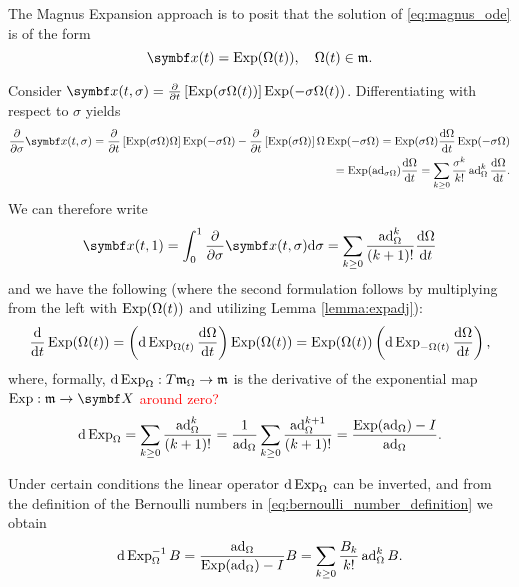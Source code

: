 The Magnus Expansion approach is to posit that the solution of \eqref{eq:magnus_ode} is of the form
\begin{equation}
  \x(t) = \Exp (\Omega(t)), \quad \Omega(t) \in \lX.
\end{equation}

Consider $\x(t, \sigma) = \frac{\partial }{\partial t} \left[ \Exp(\sigma \Omega(t)) \right] \Exp(-\sigma \Omega(t))$. Differentiating with respect to $\sigma$ yields
\begin{equation}
  \begin{aligned}
    \frac{\partial}{\partial \sigma} \x(t, \sigma) = \frac{\partial}{\partial t} \left[ \Exp(\sigma \Omega) \Omega \right] \Exp(-\sigma \Omega) - \frac{\partial}{\partial t} \left[ \Exp(\sigma \Omega) \right] \Omega \Exp(-\sigma \Omega) =  \Exp(\sigma \Omega) \frac{\mathrm{d} \Omega}{\mathrm{d}t} \Exp(-\sigma \Omega) \\
    = \Exp (\ad_{\sigma \Omega}) \frac{\mathrm{d} \Omega}{\mathrm{d}t} = \sum_{k \geq 0} \frac{\sigma^k}{k!} \ad_{\Omega}^k \frac{\mathrm{d} \Omega}{\mathrm{d}t}.
  \end{aligned}
\end{equation}
We can therefore write
\begin{equation}
  \x(t, 1) = \int_0^1 \frac{\partial}{\partial \sigma} \x(t, \sigma) \mathrm{d}\sigma = \sum_{k \geq 0} \frac{\ad_{\Omega}^k}{(k+1)!}  \frac{\mathrm{d} \Omega}{\mathrm{d}t}
\end{equation}
and we have the following (where the second formulation follows by multiplying from the left with $\operatorname{Exp}(\Omega(t))$ and utilizing Lemma \ref{lemma:expadj}):
\begin{equation}
  \label{eq:magnus_matrix_ode}
  \frac{\mathrm{d}}{\mathrm{d}t} \operatorname{Exp}(\Omega(t)) = \left(\mathrm{d} \operatorname{Exp}_{\Omega(t)} \frac{\mathrm{d} \Omega}{\mathrm{d}t} \right) \operatorname{Exp}(\Omega(t)) = \operatorname{Exp}(\Omega(t)) \left( \mathrm{d} \operatorname{Exp}_{-\Omega(t)} \frac{\mathrm{d} \Omega}{\mathrm{d}t} \right),
\end{equation}
where, formally, $\mathrm{d} \operatorname{Exp}_\Omega : T \mathfrak m_\Omega \rightarrow \mathfrak m$ is the derivative of the exponential map $\Exp: \lX \rightarrow \X$ \textcolor{red}{around zero?}
\begin{equation}
  \mathrm{d} \operatorname{Exp}_\Omega = \sum_{k \geq 0} \frac{\operatorname{ad}_{\Omega}^k}{(k+1)!} = \frac{1}{\operatorname{ad}_\Omega} \sum_{k \geq 0} \frac{\operatorname{ad}_{\Omega}^{k+1}}{(k+1)!} = \frac{\operatorname{Exp}(\operatorname{ad}_\Omega) - I}{\operatorname{ad}_\Omega}.
\end{equation}

Under certain conditions the linear operator $\mathrm{d} \operatorname{Exp}_\Omega$ can be inverted, and from the definition of the Bernoulli numbers in \eqref{eq:bernoulli_number_definition} we obtain
\begin{equation}
  \mathrm{d} \operatorname{Exp}^{-1}_\Omega B = \frac{\operatorname{ad}_\Omega}{\operatorname{Exp}(\operatorname{ad}_\Omega) - I} B = \sum_{k \geq 0} \frac{B_k}{k!} \operatorname{ad}_\Omega^k B.
\end{equation}

